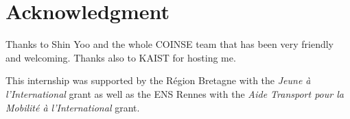 \documentclass{llncs2e/llncs}
\begin{document}
\section*{Acknowledgment}
Thanks to Shin Yoo and the whole COINSE team that has been very friendly and
welcoming. Thanks also to KAIST for hosting me.

This internship was supported by the R\'egion Bretagne with the \textit{Jeune
\`a l'International} grant as well as the ENS Rennes with the \textit{Aide
Transport pour la Mobilit\'e \`a l'International} grant.



\end{document}
